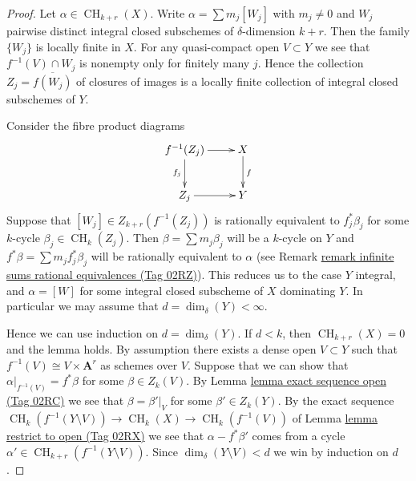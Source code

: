 \documentclass{amsart}
\theoremstyle{plain}
\theoremstyle{definition}
\theoremstyle{remark}
\numberwithin{equation}{subsection}
\def\CH{\mathop{\mathrm{CH}}\nolimits}
\begin{document}
\begin{proof}
Let $\alpha \in \CH_{k + r}(X)$.
Write $\alpha = \sum m_j[W_j]$ with $m_j \not = 0$ and
$W_j$ pairwise distinct integral closed subschemes of
$\delta$-dimension $k + r$. Then the family $\{W_j\}$
is locally finite in $X$. For any quasi-compact open
$V \subset Y$ we see that $f^{-1}(V) \cap W_j$
is nonempty only for finitely many $j$. Hence the
collection $Z_j = \overline{f(W_j)}$ of closures
of images is a locally finite collection of integral
closed subschemes of $Y$.

\medskip\noindent
Consider the fibre product diagrams
$$
\xymatrix{
f^{-1}(Z_j) \ar[r] \ar[d]_{f_j} & X \ar[d]^f \\
Z_j \ar[r] & Y
}
$$
Suppose that $[W_j] \in Z_{k + r}(f^{-1}(Z_j))$
is rationally equivalent to $f_j^*\beta_j$ for some
$k$-cycle $\beta_j \in \CH_k(Z_j)$. Then
$\beta = \sum m_j \beta_j$ will be a $k$-cycle on $Y$
and $f^*\beta = \sum m_j f_j^*\beta_j$ will be rationally
equivalent to $\alpha$ (see
Remark \href{https://stacks.math.columbia.edu/tag/02RZ}{remark infinite sums rational equivalences (Tag 02RZ)}).
This reduces us to the case $Y$ integral, and
$\alpha = [W]$ for some integral closed subscheme
of $X$ dominating $Y$. In particular we may
assume that $d = \dim_\delta(Y) < \infty$.

\medskip\noindent
Hence we can use induction on $d = \dim_\delta(Y)$.
If $d < k$, then $\CH_{k + r}(X) = 0$ and the lemma holds.
By assumption there exists a dense open $V \subset Y$ such
that $f^{-1}(V) \cong V \times \mathbf{A}^r$ as schemes over $V$.
Suppose that we can show that $\alpha|_{f^{-1}(V)} = f^*\beta$
for some $\beta \in Z_k(V)$. By Lemma \href{https://stacks.math.columbia.edu/tag/02RC}{lemma exact sequence open (Tag 02RC)}
we see that
$\beta = \beta'|_V$ for some $\beta' \in Z_k(Y)$.
By the exact sequence
$\CH_k(f^{-1}(Y \setminus V)) \to \CH_k(X) \to \CH_k(f^{-1}(V))$
of Lemma \href{https://stacks.math.columbia.edu/tag/02RX}{lemma restrict to open (Tag 02RX)}
we see that $\alpha - f^*\beta'$ comes from
a cycle $\alpha' \in \CH_{k + r}(f^{-1}(Y \setminus V))$.
Since $\dim_\delta(Y \setminus V) < d$ we win by
induction on $d$.


\end{proof}
\end{document}
